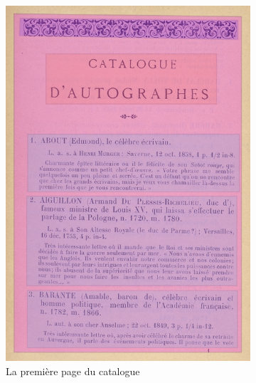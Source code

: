 \begin{figure}
\begin{subfigure}{0.33\textwidth}
		\includegraphics[width=\textwidth]{img/cat_000434_p1_zones.png}
		\caption{La première page du catalogue}
		\label{fig:catp1}
	\end{subfigure}
	\begin{subfigure}{0.33\textwidth}

\end{subfigure}
\end{figure}
